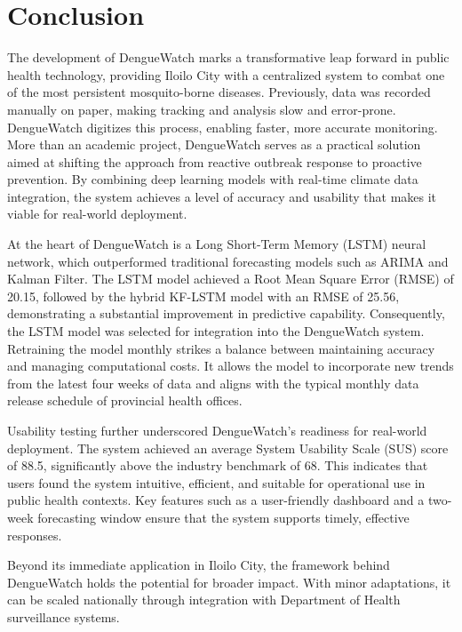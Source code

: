 \chapter{Conclusion}

The development of DengueWatch marks a transformative leap forward in public health technology, providing Iloilo City with a centralized system to combat one of the most persistent mosquito-borne diseases. Previously, data was recorded manually on paper, making tracking and analysis slow and error-prone. DengueWatch digitizes this process, enabling faster, more accurate monitoring. More than an academic project, DengueWatch serves as a practical solution aimed at shifting the approach from reactive outbreak response to proactive prevention. By combining deep learning models with real-time climate data integration, the system achieves a level of accuracy and usability that makes it viable for real-world deployment.

At the heart of DengueWatch is a Long Short-Term Memory (LSTM) neural network, which outperformed traditional forecasting models such as ARIMA and Kalman Filter. The LSTM model achieved a Root Mean Square Error (RMSE) of 20.15, followed by the hybrid KF-LSTM model with an RMSE of 25.56, demonstrating a substantial improvement in predictive capability. Consequently, the LSTM model was selected for integration into the DengueWatch system. Retraining the model monthly strikes a balance between maintaining accuracy and managing computational costs. It allows the model to incorporate new trends from the latest four weeks of data and aligns with the typical monthly data release schedule of provincial health offices.


Usability testing further underscored DengueWatch’s readiness for real-world deployment. The system achieved an average System Usability Scale (SUS) score of 88.5, significantly above the industry benchmark of 68. This indicates that users found the system intuitive, efficient, and suitable for operational use in public health contexts. Key features such as a user-friendly dashboard and a two-week forecasting window ensure that the system supports timely, effective responses.

Beyond its immediate application in Iloilo City, the framework behind DengueWatch holds the potential for broader impact. With minor adaptations, it can be scaled nationally through integration with Department of Health surveillance systems.

